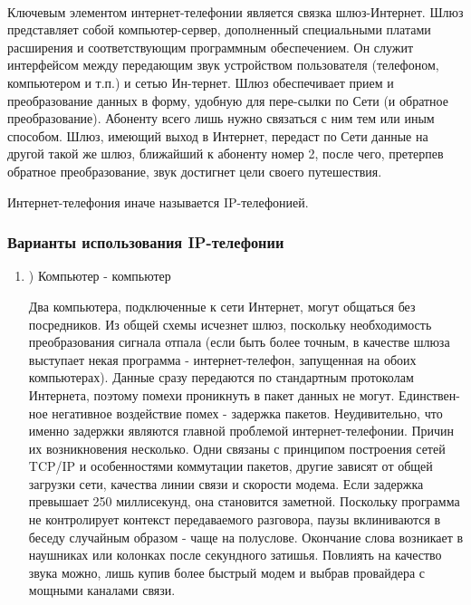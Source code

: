\documentclass[a4paper]{report}
\begin{document}
~

Ключевым элементом интернет-телефонии является связка шлюз-Интернет. Шлюз представляет собой компьютер-сервер, дополненный специальными платами расширения и соответствующим программным обеспечением. Он служит интерфейсом между передающим звук устройством пользователя (телефоном, компьютером и т.п.) и сетью Ин-тернет. Шлюз обеспечивает прием и преобразование данных в форму, удобную для пере-сылки по Сети (и обратное преобразование). Абоненту всего лишь нужно связаться с ним тем или иным способом. Шлюз, имеющий выход в Интернет, передаст по Сети данные на другой такой же шлюз, ближайший к абоненту номер 2, после чего, претерпев обратное преобразование, звук достигнет цели своего путешествия.

Интернет-телефония иначе называется IP-телефонией.

\newpage
\subsubsection{Варианты использования IP-телефонии}
\begin{enumerate}
\item) Компьютер - компьютер

\par Два компьютера, подключенные к сети Интернет, могут общаться без посредников. Из общей схемы исчезнет шлюз, поскольку необходимость преобразования сигнала отпала (если быть более точным, в качестве шлюза выступает некая программа - интернет-телефон, запущенная на обоих компьютерах). Данные сразу передаются по стандартным протоколам Интернета, поэтому помехи проникнуть в пакет данных не могут. Единствен-ное негативное воздействие помех - задержка пакетов. Неудивительно, что именно задержки являются главной проблемой интернет-телефонии. Причин их возникновения несколько. Одни связаны с принципом построения сетей TCP/IP и особенностями коммутации пакетов, другие зависят от общей загрузки сети, качества линии связи и скорости модема. Если задержка превышает 250 миллисекунд, она становится заметной. Поскольку программа не контролирует контекст передаваемого разговора, паузы вклиниваются в беседу случайным образом - чаще на полуслове. Окончание слова возникает в наушниках или колонках после секундного затишья. Повлиять на качество звука можно, лишь купив более быстрый модем и выбрав провайдера с мощными каналами связи.






\end{enumerate}
\end{document}
